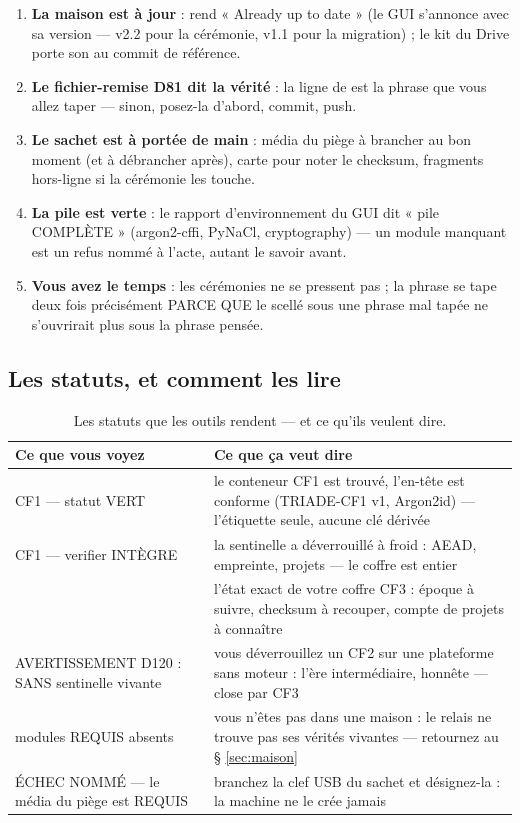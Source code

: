 \begin{enumerate}
\item \textbf{La maison est à jour} :  rend « Already up to date »
(le GUI s'annonce avec sa version — v2.2 pour la cérémonie, v1.1 pour la migration) ;
le kit du Drive porte son  au commit de référence.
\item \textbf{Le fichier-remise D81 dit la vérité} : la ligne de
 est la phrase que vous allez taper — sinon, posez-la
d'abord, commit, push.
\item \textbf{Le sachet est à portée de main} : média du piège à brancher au bon
moment (et à débrancher après), carte pour noter le checksum, fragments hors-ligne si
la cérémonie les touche.
\item \textbf{La pile est verte} : le rapport d'environnement du GUI dit
« pile COMPLÈTE » (argon2-cffi, PyNaCl, cryptography) — un module manquant est un
refus nommé à l'acte, autant le savoir avant.
\item \textbf{Vous avez le temps} : les cérémonies ne se pressent pas ; la phrase se
tape deux fois précisément PARCE QUE le scellé sous une phrase mal tapée ne
s'ouvrirait plus sous la phrase pensée.
\end{enumerate}

\subsection{Les statuts, et comment les lire}\label{sec:statuts}

\begin{table}[htbp]
\centering\small
\caption{Les statuts que les outils rendent — et ce qu'ils veulent dire.}
\label{tab:statuts}
\begin{tabularx}{\textwidth}{@{}l Y@{}}
\toprule
\textbf{Ce que vous voyez} & \textbf{Ce que ça veut dire} \\
\midrule
CF1 — statut VERT & le conteneur CF1 est trouvé, l'en-tête est conforme
(TRIADE-CF1 v1, Argon2id) — l'étiquette seule, aucune clé dérivée \\
CF1 — verifier INTÈGRE & la sentinelle a déverrouillé à froid : AEAD, empreinte,
projets — le coffre est entier \\
 & l'état
exact de votre coffre CF3 : époque à suivre, checksum à recouper, compte de projets
à connaître \\
AVERTISSEMENT D120 : SANS sentinelle vivante & vous déverrouillez un CF2 sur une
plateforme sans moteur : l'ère intermédiaire, honnête — close par CF3 \\
modules REQUIS absents & vous n'êtes pas dans une maison : le relais ne trouve pas
ses vérités vivantes — retournez au § \ref{sec:maison} \\
ÉCHEC NOMMÉ — le média du piège est REQUIS & branchez la clef USB du sachet et
désignez-la : la machine ne le crée jamais \\
\bottomrule
\end{tabularx}
\end{table}

